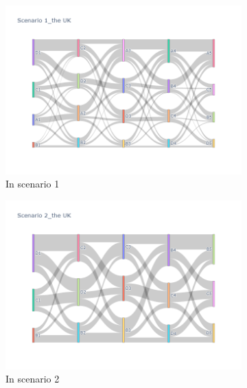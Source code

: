 \begin{figure}[h]
  \begin{subfigure}{0.5\textwidth}
    \centering
    \includegraphics[width=\textwidth]{Figure/figure35a.png}
    \caption{In scenario 1}
    \label{fig35a}
  \end{subfigure}
  \begin{subfigure}{0.5\textwidth}
    \centering
    \includegraphics[width=\linewidth]{Figure/figure35b.png}
    \caption{In scenario 2}
    \label{fig35b}
  \end{subfigure}
  \begin{subfigure}{0.5\textwidth}
    \centering

\end{subfigure}
\end{figure}
